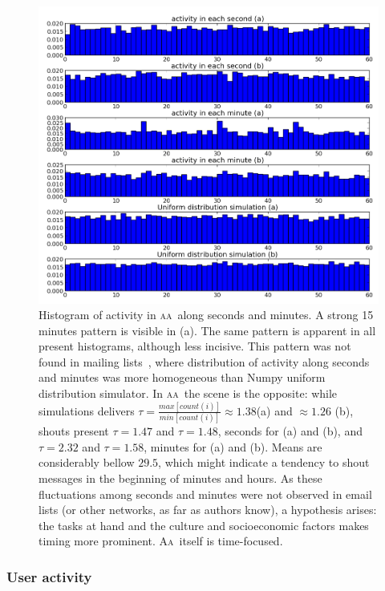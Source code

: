 \documentclass[a4paper, 11pt]{article} %
\newcommand{\aab}{\textsc{aa}}
\newcommand{\aai}{\textsc{Aa}}
\begin{document}


\begin{figure}[H]
    \hspace{-25mm}
    \includegraphics[width=1.3\textwidth]{imgs/segMinHist}
    \caption{\small Histogram of activity in \aab\ along seconds and minutes. A strong 15 minutes pattern is visible in (a). The same pattern is apparent in all present histograms, although less incisive. This pattern was not found in mailing lists~\cite{rc1}, where distribution of activity along seconds and minutes was more homogeneous than Numpy uniform distribution simulator. In \aab\ the scene is the opposite: while simulations delivers $\tau=\frac{max[count(i)]}{min[count(i)]}\approx1.38$(a) and $\approx 1.26$ (b), shouts present $\tau=1.47$ and $\tau=1.48$, seconds for (a) and (b), and$\tau=2.32$ and $\tau=1.58$, minutes for (a) and (b). Means are considerably bellow $29.5$, which might indicate a tendency to shout messages in the beginning of minutes and hours. As these fluctuations among seconds and minutes were not observed in email lists (or other networks, as far as authors know), a hypothesis arises: the tasks at hand and the culture and socioeconomic factors makes timing more prominent. \aai\ itself is time-focused.}\label{fig:histSecMin}
\end{figure}



\subsubsection{User activity}
\end{document}
